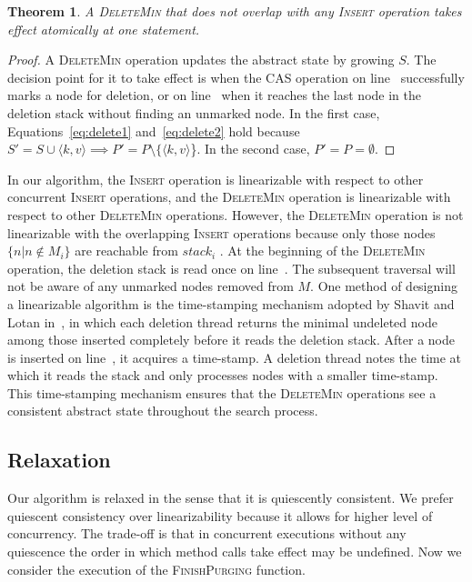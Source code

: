 \documentclass[10pt,journal,letterpaper,compsoc]{IEEEtran}
\newtheorem{theorem}{Theorem}
\begin{document}
\begin{theorem}
    A \textsc{DeleteMin} that does not overlap with any \textsc{Insert} operation takes effect atomically at one statement.
\end{theorem}
\begin{proof}
    A \textsc{DeleteMin} operation updates the abstract state by growing $S$.
    The decision point for it to take effect is when the CAS operation on line~ successfully marks a node for deletion, or on line~ when it reaches the last node in the deletion stack without finding an unmarked node.
    In the first case, Equations~\ref{eq:delete1} and~\ref{eq:delete2} hold because $S' = S \cup \langle k,v \rangle \implies P' = P \setminus \{\langle k,v \rangle$\}.
    In the second case, $P' = P = \emptyset$.
\end{proof}

In our algorithm, the \textsc{Insert} operation is linearizable with respect to other concurrent \textsc{Insert} operations, and the \textsc{DeleteMin} operation is linearizable with respect to other \textsc{DeleteMin} operations.
However, the \textsc{DeleteMin} operation is not linearizable with the overlapping \textsc{Insert} operations because only those nodes $\{n|n \notin M_i\}$ are reachable from $stack_i$ .
At the beginning of the \textsc{DeleteMin} operation, the deletion stack is read once on line~. 
The subsequent traversal will not be aware of any unmarked nodes removed from $M$.
One method of designing a linearizable algorithm is the time-stamping mechanism adopted by Shavit and Lotan in~\cite{shavit2000skiplist}, in which each deletion thread returns the minimal undeleted node among those inserted completely before it reads the deletion stack.
After a node is inserted on line~, it acquires a time-stamp.
A deletion thread notes the time at which it reads the stack and only processes nodes with a smaller time-stamp.  
This time-stamping mechanism ensures that the \textsc{DeleteMin} operations see a consistent abstract state throughout the search process.

\subsection{Relaxation}
Our algorithm is relaxed in the sense that it is quiescently consistent.
We prefer quiescent consistency over linearizability because it allows for higher level of concurrency.
The trade-off is that in concurrent executions without any quiescence the order in which method calls take effect may be undefined.
Now we consider the execution of the \textsc{FinishPurging} function.
\end{document}
